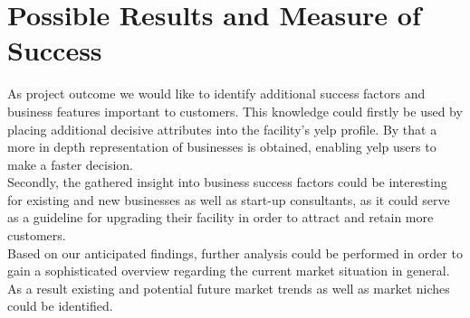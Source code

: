 \section{Possible Results and Measure of Success}
\label{cha:conclusion}
As project outcome we would like to identify additional success factors and business features important to customers. This knowledge could firstly be used by placing additional decisive attributes into the facility's yelp profile. By that a more in depth representation of businesses is obtained, enabling yelp users to make a faster decision.\\ 
Secondly, the gathered insight into business success factors could be interesting for existing and new businesses as well as start-up consultants, as it could serve as a guideline for upgrading their facility in order to attract and retain more customers.\\ 
Based on our anticipated findings, further analysis could be performed in order to gain a sophisticated overview regarding the current market situation in general. As a result existing and potential future market trends as well as market niches could be identified.\\ 